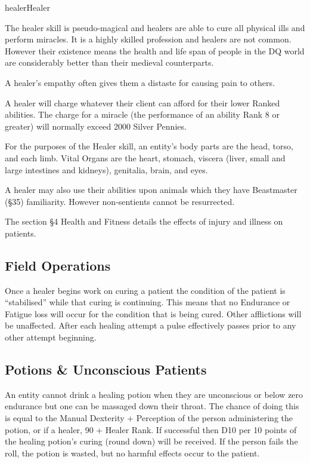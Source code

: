 \begin{Skill}[1.4]{healer}{Healer}

The healer skill is pseudo-magical and healers are able to cure all
physical ills and perform miracles.  It is a highly skilled profession
and healers are not common.  However their existence means the health
and life span of people in the DQ world are considerably better than
their medieval counterparts.

A healer’s empathy often gives them a distaste for causing pain to
others.

A healer will charge whatever their client can afford for their lower
Ranked abilities.  The charge for a miracle (the performance of an
ability Rank 8 or greater) will normally exceed 2000 Silver Pennies.

For the purposes of the Healer skill, an entity’s body parts are the
head, torso, and each limb.  Vital Organs are the heart, stomach,
viscera (liver, small and large intestines and kidneys), genitalia,
brain, and eyes.

A healer may also use their abilities upon animals which they have
Beastmaster (§35) familiarity.  However non-sentients cannot be
resurrected.

The section §4 Health and Fitness details the effects of injury and
illness on patients.

\subsection{Field Operations}

Once a healer begins work on curing a patient the condition of the
patient is “stabilised” while that curing is continuing. This means
that no Endurance or Fatigue loss will occur for the condition that is
being cured.  Other afflictions will be unaffected.  After each
healing attempt a pulse effectively passes prior to any other attempt
beginning.

\subsection{Potions \& Unconscious Patients}

An entity cannot drink a healing potion when they are unconscious or
below zero endurance but one can be massaged down their throat. The
chance of doing this is equal to the Manual Dexterity + Perception
of the person administering the potion, or if a healer, 90 + Healer
Rank. If successful then D10 per 10 points of the healing potion’s
curing (round down) will be received. If the person fails the roll,
the potion is wasted, but no harmful effects occur to the patient.


\end{Skill}
